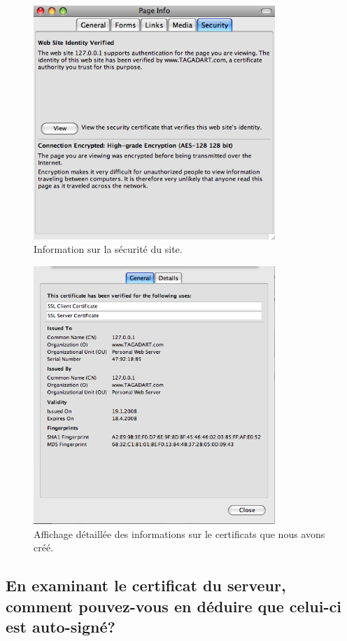 \documentclass[10pt,a4paper,titlepage]{article}
\begin{document}
\begin{figure}[htbp]
   \begin{center}
      \includegraphics[width=345px]{img/3.png}
   \end{center}
   \caption{Information sur la sécurité du site.}
	\label{fig:infosecu}
\end{figure}


\begin{figure}[htbp]
   \begin{center}
      \includegraphics[width=345px]{img/4.png}
   \end{center}
   \caption{Affichage détaillée des informations sur le certificats que nous avons créé.}
	\label{fig:certif}
\end{figure}

\subsection{En examinant le certificat du serveur, comment pouvez-vous en déduire que celui-ci est auto-signé?}
\end{document}
